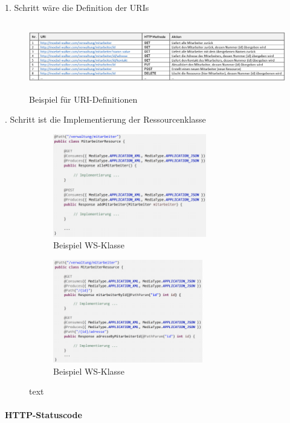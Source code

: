 \documentclass[a4paper]{article}
\begin{document}
				1. Schritt wäre die Definition der URIs
				
				\begin{figure}[!htb]
					\centering
					\includegraphics[keepaspectratio, height=3cm]{img/ws/definitions.png}
					\caption{Beispiel für URI-Definitionen}
					\label{fig:definitions}
				\end{figure}
			. Schritt ist die Implementierung der Ressourcenklasse
		
			\begin{figure}[!htb]
				\centering
				\begin{subfigure}{.45\textwidth}
					\centering
					\includegraphics[keepaspectratio, height=4.5cm]{img/ws/res_01.png}
					\caption{Beispiel WS-Klasse}
					\label{fig:res_01}
				\end{subfigure}
				\begin{subfigure}{.45\textwidth}
					\centering
					\includegraphics[keepaspectratio, height=4.5cm]{img/ws/res_02.png}
					\caption{Beispiel WS-Klasse}
					\label{fig:res_02}
				\end{subfigure}
				\caption{text}
				\label{fig:ressourceclass}
			\end{figure}
		
		\paragraph{HTTP-Statuscode}
		
\end{document}
